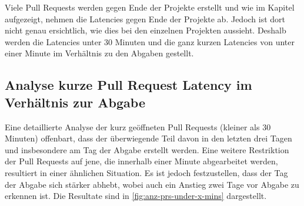 Viele Pull Requests werden gegen Ende der Projekte erstellt und wie im Kapitel  aufgezeigt, nehmen die Latencies gegen Ende der Projekte ab. Jedoch ist dort nicht genau ersichtlich, wie dies bei den einzelnen Projekten aussieht. Deshalb werden die Latencies unter 30 Minuten und die ganz kurzen Latencies von unter einer Minute im Verhältnis zu den Abgaben gestellt.

\newpage
\subsection{Analyse kurze Pull Request Latency im Verhältnis zur Abgabe }
Eine detaillierte Analyse der kurz geöffneten Pull Requests (kleiner als 30 Minuten) offenbart, dass der überwiegende Teil davon in den letzten drei Tagen und insbesondere am Tag der Abgabe erstellt werden. Eine weitere Restriktion der Pull Requests auf jene, die innerhalb einer Minute abgearbeitet werden, resultiert in einer ähnlichen Situation. Es ist jedoch festzustellen, dass der Tag der Abgabe sich stärker abhebt, wobei auch ein Anstieg zwei Tage vor Abgabe zu erkennen ist.  Die Resultate sind in \autoref{fig:anz-prs-under-x-mins} dargestellt.

